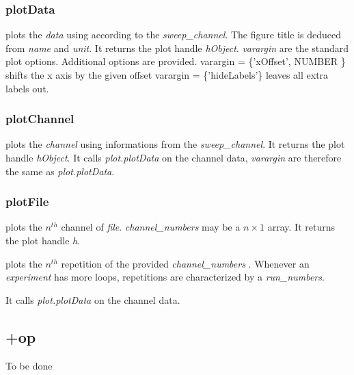 \subsubsection{plotData}
\bdf
{} plots the \emph{data} using according to the \emph{sweep\_channel}. The figure title is deduced from \emph{name} and \emph{unit}. It returns the plot handle \emph{hObject}. \emph{varargin} are the standard plot options. Additional options are provided.
\bi
\+ varargin = \{'xOffset', NUMBER \} shifts the x axis by the given offset
\+ varargin = \{'hideLabels'\} leaves all extra labels out.
\ei
\edf
\subsubsection{plotChannel}
\bdf
{} plots the \emph{channel} using informations from the \emph{sweep\_channel}. It returns the plot handle  \emph{hObject}. It calls \emph{plot.plotData} on the channel data, \emph{varargin} are therefore the same as \emph{plot.plotData}.
\edf


\subsubsection{plotFile}

\bdf
{} plots the $n^{th}$ channel of \emph{file}. \emph{channel\_numbers} may be a $n \times 1$ array. It returns the plot handle \emph{h}.

 plots the $n^{th}$ repetition of the provided \emph{channel\_numbers} . Whenever an \emph{experiment} has more loops, repetitions are characterized by a \emph{run\_numbers}.
\edf

It calls \emph{plot.plotData} on the channel data.

\subsection{+op}

To be done
%
